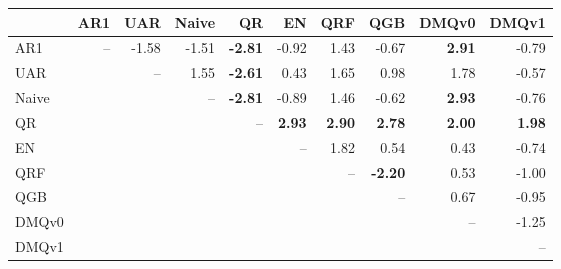 \begin{tabular}{lrrrrrrrrr}
\toprule
 & AR1 & UAR & Naive & QR & EN & QRF & QGB & DMQv0 & DMQv1 \\
\midrule
AR1 & -- & -1.58 & -1.51 & \textbf{-2.81} & -0.92 & 1.43 & -0.67 & \textbf{2.91} & -0.79 \\
UAR &  & -- & 1.55 & \textbf{-2.61} & 0.43 & 1.65 & 0.98 & 1.78 & -0.57 \\
Naive &  &  & -- & \textbf{-2.81} & -0.89 & 1.46 & -0.62 & \textbf{2.93} & -0.76 \\
QR &  &  &  & -- & \textbf{2.93} & \textbf{2.90} & \textbf{2.78} & \textbf{2.00} & \textbf{1.98} \\
EN &  &  &  &  & -- & 1.82 & 0.54 & 0.43 & -0.74 \\
QRF &  &  &  &  &  & -- & \textbf{-2.20} & 0.53 & -1.00 \\
QGB &  &  &  &  &  &  & -- & 0.67 & -0.95 \\
DMQv0 &  &  &  &  &  &  &  & -- & -1.25 \\
DMQv1 &  &  &  &  &  &  &  &  & -- \\
\bottomrule
\end{tabular}
